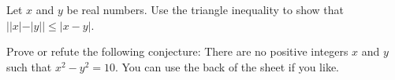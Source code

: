 \yourname


\blist{5in}
\item Let $x$ and $y$ be real numbers.  Use the triangle inequality to show that $||x| - |y|| \leq |x - y|$.

\item Prove or refute the following conjecture:  There are no positive integers $x$ and $y$ such that $x^2 - y^2 = 10$.  You can use the back of the sheet if you like.

\elist
\vfill          %
